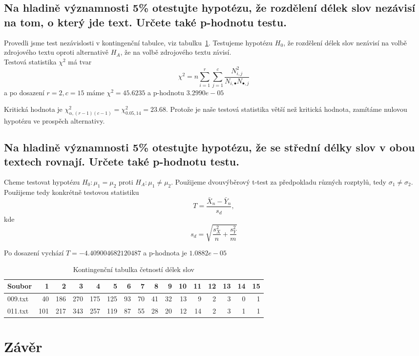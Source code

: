\documentclass[12pt]{article}
\begin{document}
    \subsection{Na hladině významnosti 5\% otestujte hypotézu, že rozdělení délek slov nezávisí na tom, o který jde text. Určete také p-hodnotu testu.}	
		
    Provedli jsme test nezávislosti v kontingenční tabulce, viz tabulku~\ref{Cont_table1}. Testujeme hypotézu $H_0$, že rozdělení délek slov nezávisí na volbě zdrojového textu oproti alternativě $H_A$, že na volbě zdrojového textu závisí. \\
Testová statistika $\chi^2$ má tvar
$$\chi^2 = n\sum_{i =1}^r\sum_{j=1}^c \frac{N_{i,j}^2}{N_{i, \bullet}N_{\bullet, j}}$$
a po dosazení $r=2, c=15$ máme $\chi^2 = 45.6235$ a p-hodnotu $3.2990e-05$

Kritická hodnota je $\chi^2_{\alpha, (r-1)(c-1)} = \chi^2_{0.05, 14} = 23.68$. Protože je naše testová statistika větší než kritická hodnota, zamítáme nulovou hypotézu ve prospěch alternativy.

\subsection{Na hladině významnosti 5\% otestujte hypotézu, že se střední délky slov v obou textech rovnají. Určete také p-hodnotu testu.}
Cheme testovat hypotézu $H_0: \mu_1 = \mu_2$ proti $H_A: \mu_1 \neq \mu_2$. Použijeme dvouvýběrový t-test za předpokladu různých rozptylů, tedy $\sigma_1 \neq \sigma_2$.\\
Použijeme tedy konkrétně testovou statistiku 
$$T = \frac{\bar{X}_n - \bar{Y}_n}{s_d},$$
kde
$$s_d = \sqrt{\frac{s_X^2}{n}+\frac{s_Y^2}{m}}$$

Po dosazení vychází $T = -4.409004682120487$ a p-hodnota je $1.0882e-05$

    \begin{table}[!ht]
    \centering
    \begin{tabular}{|l|rrrrrrrrrrrrrrr|} \hline
Soubor &  1  &   2  &   3  &   4  &   5  &  6  &  7  &  8  &  9  &  10 &  11 &  12 &  13 & 14 & 15 \\ \hline
009.txt &  40 &  186 &  270 &  175 &  125 &  93 &  70 &  41 &  32 &  13 &   9 &   2 &   3 & 0 &  1 \\ \hline
011.txt &  101 &  217 &  343 &  257 &  119 &  87 &  55 &  28 &  20 &  12 &  14 &   2 &   3 &   1 &   1 \\ \hline

\end{tabular}
\caption{Kontingenční tabulka četností délek slov}
\label{Cont_table1}
\end{table}
	
   	\section{Závěr}\label{z}
   		
\end{document}
